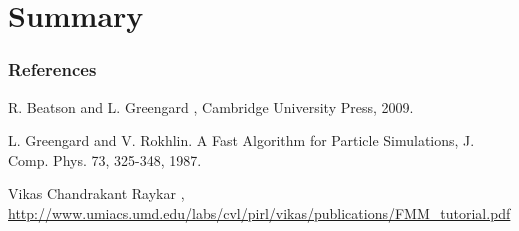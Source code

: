 \documentclass[mathserif,notes]{beamer}
\begin{document}
\section{Summary}


\begin{frame}[allowframebreaks]
  \frametitle<presentation>{References}    
  \begin{thebibliography}{10}    

 \beamertemplatebookbibitems
 R. Beatson and L. Greengard
    ,
   \newblock Cambridge University Press, 2009.

 \beamertemplatearticlebibitems
L. Greengard and V. Rokhlin.
  \newblock A Fast Algorithm for Particle Simulations,
 \newblock J. Comp. Phys. 73, 325-348, 1987.
 
\beamertemplateonlinebibitems
 Vikas Chandrakant Raykar
    ,
   \newblock \url{http://www.umiacs.umd.edu/labs/cvl/pirl/vikas/publications/FMM_tutorial.pdf}

 \end{thebibliography}
 \end{frame}
 
\end{document}
